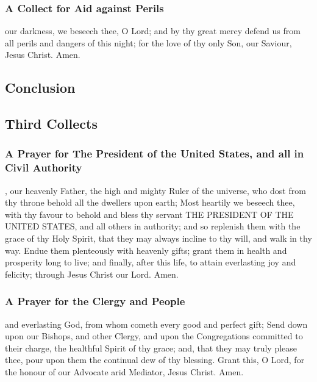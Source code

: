 \subsubsection{A Collect for Aid against Perils}
 our darkness, we beseech thee, O Lord; and by thy great mercy defend us from all perils and dangers of this night; for the love of thy only Son, our Saviour, Jesus Christ. Amen.
\subsection{Conclusion}
\subsection{Third Collects}
\subsubsection{A Prayer for The President of the United States, and all in Civil Authority}
, our heavenly Father, the high and mighty Ruler of the universe, who dost from thy throne behold all the dwellers upon earth; Most heartily we beseech thee, with thy favour to behold and bless thy servant THE PRESIDENT OF THE UNITED STATES, and all others in authority; and so replenish them with the grace of thy Holy Spirit, that they may always incline to thy will, and walk in thy way. Endue them plenteously with heavenly gifts; grant them in health and prosperity long to live; and finally, after this life, to attain everlasting joy and felicity; through Jesus Christ our Lord. Amen.
\subsubsection{A Prayer for the Clergy and People}
 and everlasting God, from whom cometh every good and perfect gift; Send down upon our Bishops, and other Clergy, and upon the Congregations committed to their charge, the healthful Spirit of thy grace; and, that they may truly please thee, pour upon them the continual dew of thy blessing. Grant this, O Lord, for the honour of our Advocate arid Mediator, Jesus Christ. Amen.
